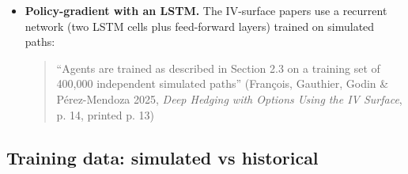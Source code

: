 \documentclass{article}
\begin{document}
\begin{itemize}
\begin{quote}``For the hedging problem at hand QR is an attractive solution as it is straightforward to measure value at risk (VaR) and conditional value at risk (CVaR) directly on the quantile-based representation that it generates.'' (Cao et al. 2022, \emph{Gamma and Vega Hedging Using Deep Distributional RL}, p. 6)\end{quote}

They chose actor-critic because simulation was cheap:

\begin{quote}``In our setting, simulating the portfolio is a fast process and not the bottleneck'' (same, p. 6)\end{quote}

\item \textbf{Policy-gradient with an LSTM.} The IV-surface papers use a recurrent network (two LSTM cells plus feed-forward layers) trained on simulated paths:

\begin{quote}``Agents are trained as described in Section 2.3 on a training set of 400,000 independent simulated paths'' (François, Gauthier, Godin \& Pérez-Mendoza 2025, \emph{Deep Hedging with Options Using the IV Surface}, p. 14, printed p. 13)\end{quote}

\end{itemize}

\subsection{Training data: simulated vs historical}
\end{document}
